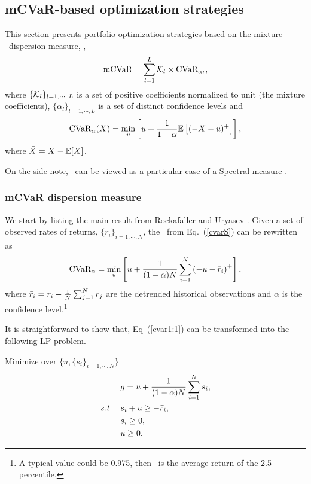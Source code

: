 
\subsection{mCVaR-based optimization strategies}\label{S:mCVaR}

This section presents portfolio optimization strategies based on the mixture \CVaR\ dispersion measure, \ie,
\begin{equation}
    \mCVaR = \sum_{l=1}^{L} \cK_l \times \CVaR_{\alpha_l},
    \label{cvar0}
\end{equation}
where $\{{\cal K}_l\}_{l=1,\cdots,L}$ is a set of positive coefficients normalized to unit (the mixture coefficients),
$\{\alpha_l\}_{l=1,\cdots,L}$ is a set of distinct confidence levels and
\begin{equation}
    \CVaR_\alpha(X) = \min_u\left[u + \frac{1}{1-\alpha}\mE\left[(-\bX-u)^+\right] \right],
    \label{cvarS}
\end{equation}
where ${\bar X} = X - {\mathbb E}[X]$.

On the side note, \mCVaR\ can be viewed as a particular case of
a Spectral measure \cite{Acerbi}.

\BackToContents


\subsubsection{mCVaR dispersion measure}

We start by listing the main result from Rockafaller and Uryasev \cite{Uryasev}.
Given a set of observed rates of returns, $\{r_i\}_{i=1,\cdots,N}$,
the \CVaR\ from Eq.~(\ref{cvarS}) can be rewritten as
\begin{equation}
    \CVaR_\alpha = \min_u\left[ u +  \frac{1}{(1-\alpha)N} \sum_{i=1}^N \left(-u -\br_i \right)^+ \right],
    \label{cvar1:1}
\end{equation}
where ${\bar r}_i = r_i - \frac{1}{N}\sum_{j=1}^N r_j$ are the detrended historical observations and
$\alpha$ is the confidence level.\footnote{A typical value could be 0.975, then \CVaR\ is the
average return of the 2.5 percentile.}


It is straightforward to show that, Eq~(\ref{cvar1:1}) can be transformed into the
following LP problem.

\bigskip
\noindent Minimize over $\{u, \{s_i\}_{i=1,\cdots,N}\}$
\begin{subequations}\label{cvar1}
\begin{align}
    &g = u + \frac{1}{(1-\alpha) N} \sum_{i=1}^N s_i, \label{cvar1a} \\
    \st & s_i + u \geq - \br_i, \label{cvar1b} \\
        & s_i \geq 0, \label{cvar1c} \\
        & u \geq 0. \label{cvar1d}
\end{align}
\end{subequations}

